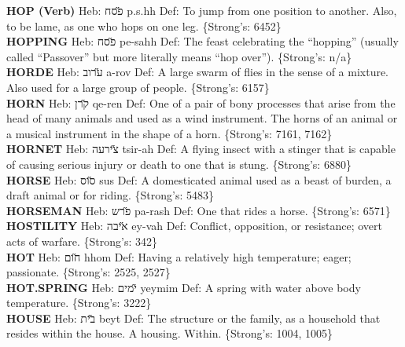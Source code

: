 {\textbf{HOP (Verb)} Heb: {\large\H פסח} p.s.hh Def: To jump from one position to another. Also, to be lame, as one who hops on one leg. \{Strong's: 6452\}\hfill{}\\

\textbf{HOPPING} Heb: {\large\H פסח} pe-sahh Def: The feast celebrating the ``hopping'' (usually called ``Passover'' but more literally means ``hop over''). \{Strong's: n/a\}\hfill{}\\

\textbf{HORDE} Heb: {\large\H ערוב} a-rov Def: A large swarm of flies in the sense of a mixture. Also used for a large group of people. \{Strong's: 6157\}\hfill{}\\

\textbf{HORN} Heb: {\large\H קרן} qe-ren Def: One of a pair of bony processes that arise from the head of many animals and used as a wind instrument. The horns of an animal or a musical instrument in the shape of a horn. \{Strong's: 7161, 7162\}\hfill{}\\

\textbf{HORNET} Heb: {\large\H צירעה} tsir-ah Def: A flying insect with a stinger that is capable of causing serious injury or death to one that is stung. \{Strong's: 6880\}\hfill{}\\

\textbf{HORSE} Heb: {\large\H סוס} sus Def: A domesticated animal used as a beast of burden, a draft animal or for riding. \{Strong's: 5483\}\hfill{}\\

\textbf{HORSEMAN} Heb: {\large\H פרש} pa-rash Def: One that rides a horse. \{Strong's: 6571\}\hfill{}\\

\textbf{HOSTILITY} Heb: {\large\H איבה} ey-vah Def: Conflict, opposition, or resistance; overt acts of warfare. \{Strong's: 342\}\hfill{}\\

\textbf{HOT} Heb: {\large\H חום} hhom Def: Having a relatively high temperature; eager; passionate. \{Strong's: 2525, 2527\}\hfill{}\\

\textbf{HOT.SPRING} Heb: {\large\H ימים} yeymim Def: A spring with water above body temperature. \{Strong's: 3222\}\hfill{}\\

\textbf{HOUSE} Heb: {\large\H בית} beyt Def: The structure or the family, as a household that resides within the house. A housing. Within. \{Strong's: 1004, 1005\}\hfill{}\\

}
